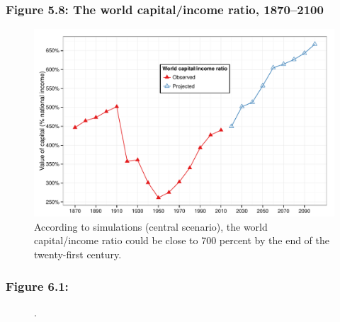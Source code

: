 \documentclass[t]{beamer}\usepackage[]{graphicx}\usepackage[]{color}
\newenvironment{knitrout}{}{} %
\begin{document}
\begin{frame}[label=Figure_5_8]
\frametitle{Figure 5.8: The world capital/income ratio, 1870--2100}
\begin{figure}[t]
\begin{minipage}[b]{\textwidth}
\centering
\begin{knitrout}\footnotesize
{}\color{fgcolor}

{\centering \includegraphics[width=1\linewidth]{figures/color/Figure_5_8} 

}



\end{knitrout}
\caption{According to simulations (central scenario), the world capital/income ratio could be close to 700 percent by the end of the twenty-first century.}
\end{minipage}
\end{figure}
\end{frame}


\begin{frame}[label=Figure_6_1]
\frametitle{Figure 6.1: }
\begin{figure}[t]
\begin{minipage}[b]{\textwidth}
\centering

\caption{.}
\end{minipage}
\end{figure}
\end{frame}
\end{document}
